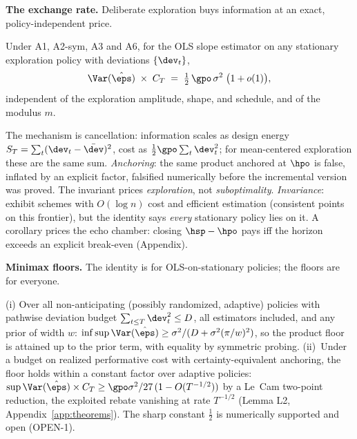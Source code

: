 \documentclass{article}
\begin{document}
\textbf{The exchange rate.} Deliberate exploration buys information at an exact, policy-independent price.

\begin{theorem}
\label{thm:exchange}
Under A1, A2-sym, A3 and A6, for the OLS slope estimator on any stationary exploration policy with deviations $\{\dev_t\}$,
\[
\Var(\hat\eps)\;\times\;C_T \;=\; \tfrac{1}{2}\,\gpo\,\sigma^2\;\big(1 + o(1)\big),
\]
independent of the exploration amplitude, shape, and schedule, and of the modulus $m$.
\end{theorem}

The mechanism is cancellation: information scales as design energy $S_T=\sum_t(\dev_t-\bar \dev)^2$, cost as $\tfrac{1}{2}\gpo\sum_t \dev_t^2$; for mean-centered exploration these are the same sum. \emph{Anchoring}: the same product anchored at $\hpo$ is false, inflated by an explicit factor, falsified numerically before the incremental version was proved. The invariant prices \emph{exploration}, not \emph{suboptimality}. \emph{Invariance}: \citet{lai1979adaptive} exhibit schemes with $O(\log n)$ cost and efficient estimation (consistent points on this frontier), but the identity says \emph{every} stationary policy lies on it. A corollary prices the echo chamber: closing $\hsp - \hpo$ pays iff the horizon exceeds an explicit break-even (Appendix).

\textbf{Minimax floors.} The identity is for OLS-on-stationary policies; the floors are for everyone.

\begin{theorem}
\label{thm:devbudget}
(i) Over all non-anticipating (possibly randomized, adaptive) policies with pathwise deviation budget $\sum_{t\le T}\dev_t^2 \le D$, all estimators included, and any prior of width $w$: $\inf\sup\Var(\hat\eps) \ge \sigma^2/(D + \sigma^2(\pi/w)^2)$, so the product floor is attained up to the prior term, with equality by symmetric probing. (ii)~Under a budget on realized performative cost with certainty-equivalent anchoring, the floor holds within a constant factor over adaptive policies: $\sup \Var(\hat\eps)\times C_T \ge \gpo\sigma^2/27\,(1-O(T^{-1/2}))$ by a Le~Cam two-point reduction, the exploited rebate vanishing at rate $T^{-1/2}$ (Lemma L2, Appendix~\ref{app:theorems}). The sharp constant $\tfrac{1}{2}$ is numerically supported and open (OPEN-1).
\end{theorem}
\end{document}
